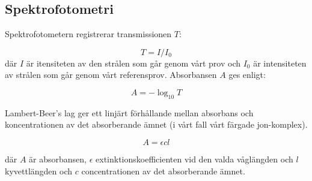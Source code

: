 \subsection{Spektrofotometri}
Spektrofotometern registrerar transmissionen $T$:

\begin{equation}
  T = I/I_0
\end{equation}
där $I$ är itensiteten av den strålen som går genom vårt prov
och $I_0$ är intensiteten av strålen som går genom vårt referensprov.
Absorbansen $A$ ges enligt:

\begin{equation}
  \label{eq:absorbance}
  A = -\log_{10}T
\end{equation}

Lambert-Beer's lag ger ett linjärt förhållande mellan absorbans och
koncentrationen av det absorberande ämnet (i vårt fall vårt färgade jon-komplex). 

\begin{equation}
  \label{eq:lambert-beer}
  A = \epsilon c l
\end{equation}

där $A$ är absorbansen, $\epsilon$ extinktionskoefficienten vid den valda
våglängden och $l$ kyvettlängden och $c$ concentrationen av det
absorberande ämnet. 
